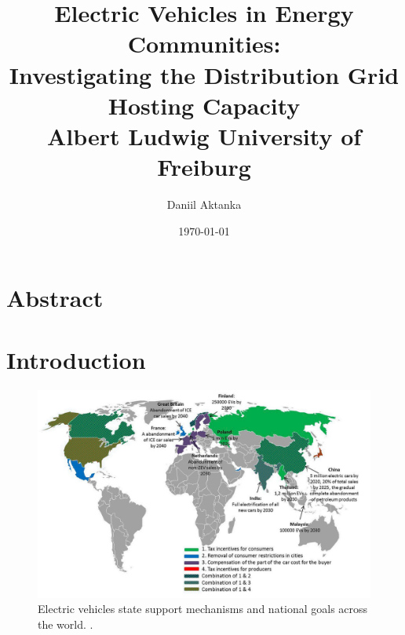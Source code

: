 \documentclass[a4paper,10pt]{report}
\begin{document}
\title{
	\vspace{2cm}
	{\LARGE Electric Vehicles in Energy Communities:}\\
	{\Large Investigating the Distribution Grid Hosting Capacity} \\[2cm]
	{\large Albert Ludwig University of Freiburg}
}
\author{
	\Large Daniil Aktanka
}
\date{
	\normalsize \today
}
\maketitle
\thispagestyle{empty}


\chapter*{Abstract}



\listoftables
{}
\cleardoublepage

\listoffigures
{}
\cleardoublepage

\tableofcontents\cleardoublepage



\chapter{Introduction}

\begin{figure}[htpb]
	\centering
	\includegraphics[width=\linewidth]{ev_state_support_mech}
	\caption[Centralized and decentralized control architecture]{Electric vehicles state support mechanisms and national goals across the world. \cite{Kapustin2020}.}
	\label{ev_state_support_mech}
\end{figure}
\end{document}
